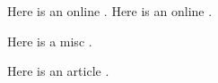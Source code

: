 \documentclass{article}
\begin{document}
\maketitle

\renewcommand{\BRetrieved}[1]{Recuperado el {#1} de\ }%


Here is an online  \cite{WinNT}.
Here is an online  \cite{WinNT2}.

Here is a misc \cite{Onvif2016-dc}.

Here is an article \cite{Taylor2000-yr}.



\end{document}
